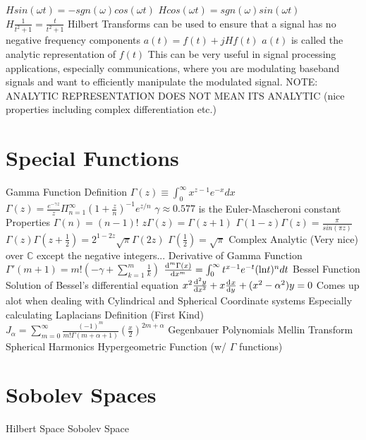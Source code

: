 \documentclass[14pt]{extarticle}
\begin{document}
\begin{outline}
					\3	$H sin(\omega t) = -sgn(\omega) cos(\omega t)$
					\3	$H cos(\omega t) = sgn(\omega) sin(\omega t)$
					\3	$H \frac{1}{t^2 + 1} = \frac{t}{t^2 + 1}$
				\2	Hilbert Transforms can be used to ensure that a signal has no
						negative frequency components
					\3	$a(t) = f(t) + j Hf(t)$
					\3	$a(t)$ is called the analytic representation of $f(t)$
					\3	This can be very useful in signal processing applications, 
							especially communications, where you are modulating baseband
							signals and want to efficiently manipulate the modulated signal.
					\3	NOTE: ANALYTIC REPRESENTATION DOES NOT MEAN ITS ANALYTIC (nice properties
							including complex differentiation etc.)
		\section*{Special Functions}
			\1	Gamma Function
				\2	Definition
					\3	$\Gamma(z) \equiv \int_0^{\infty} x^{z-1} e^{-x} dx$
					\3	$\Gamma(z) = \frac{e^{-\gamma z}}{z}\Pi_{n=1}^{\infty} (1 + \frac{z}{n})^{-1} e^{z/n}$
						\4	$\gamma \approx 0.577$ is the Euler-Mascheroni constant
				\2	Properties
					\3	$\Gamma(n) = (n-1)!$
					\3	$z \Gamma(z) = \Gamma(z+1)$	
					\3	$\Gamma(1-z)\Gamma(z) = \frac{\pi}{sin(\pi z)}$
					\3	$\Gamma(z)\Gamma(z+\frac{1}{2}) = 2^{1 - 2z} \sqrt{\pi} \Gamma(2z)$
					\3	$\Gamma(\frac{1}{2}) = \sqrt{\pi}$
					\3	Complex Analytic (Very nice) over $\mathbb{C}$ except the negative integers...
				\2	Derivative of Gamma Function
					\3	$\Gamma'(m+1) = m!(-\gamma + \sum_{k=1}^m \frac{1}{k})$
					\3	$\od[m]{\Gamma(x)}{x} = \int_0^{\infty} t^{x-1}e^{-t}(\text{ln} t)^n dt$
			\1	Bessel Function
				\2	Solution of Bessel's differential equation
					\3	$x^2 \od[2]{y}{x} + x \od{x}{y} + (x^2 - \alpha^2)y = 0$
					\3	Comes up alot when dealing with Cylindrical and Spherical Coordinate systems
					\3	Especially calculating Laplacians
				\2	Definition (First Kind)
					\3	$J_{\alpha} = \sum_{m=0}^{\infty} \frac{(-1)^m}{m! \Gamma(m + \alpha + 1)} (\frac{x}{2})^{2m+\alpha}$
			\1	Gegenbauer Polynomials
			\1	Mellin Transform
			\1	Spherical Harmonics
			\1	Hypergeometric Function (w/ $\Gamma$ functions)
		\section*{Sobolev Spaces}
			\1	Hilbert Space	
			\1	Sobolev Space
			
	\end{outline}
\end{document}
